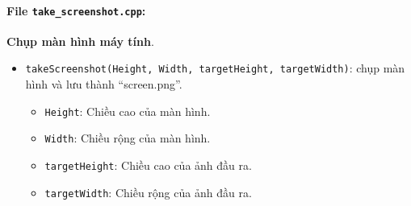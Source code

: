 \paragraph{File \texttt{take\_screenshot.cpp}:}{\textbf{Chụp màn hình máy tính}.}
\begin{itemize}
    \item \texttt{takeScreenshot(Height, Width, targetHeight, targetWidth)}: chụp màn hình và lưu thành “screen.png”.
    \begin{itemize}
        \item \texttt{Height}: Chiều cao của màn hình.
        \item \texttt{Width}: Chiều rộng của màn hình.
        \item \texttt{targetHeight}: Chiều cao của ảnh đầu ra.
        \item \texttt{targetWidth}: Chiều rộng của ảnh đầu ra.
    \end{itemize}

\end{itemize}

